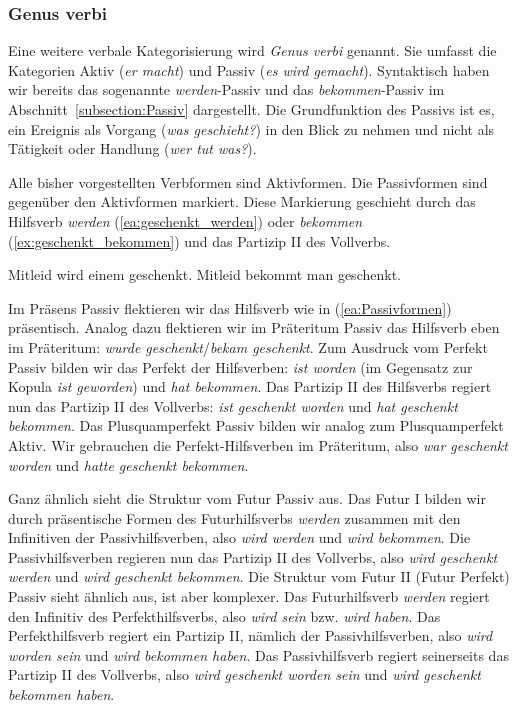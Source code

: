 \subsubsection{Genus verbi}\label{subsubsection:Genus verbi}

Eine weitere verbale Kategorisierung wird \textit{Genus verbi} genannt. Sie umfasst die Kategorien Aktiv (\textit{er macht}) und Passiv (\textit{es wird gemacht}). Syntaktisch haben wir bereits das sogenannte \textit{werden}-Passiv und das \textit{bekommen}-Passiv im Abschnitt~\ref{subsection:Passiv} dargestellt. Die Grundfunktion des Passivs ist es, ein Ereignis als Vorgang (\textit{was geschieht?}) in den Blick zu nehmen und nicht als Tätigkeit oder Handlung (\textit{wer tut was?}).

Alle bisher vorgestellten Verbformen sind Aktivformen. Die Passivformen sind gegenüber den Aktivformen markiert. Diese Markierung geschieht durch das Hilfsverb \textit{werden} (\ref{ea:geschenkt_werden}) oder \textit{bekommen} (\ref{ex:geschenkt_bekommen}) und das Partizip II des Vollverbs. 

\ea \label{ea:Passivformen}
\ea \label{ea:geschenkt_werden} Mitleid wird einem geschenkt.
\ex \label{ex:geschenkt_bekommen} Mitleid bekommt man geschenkt.
\z 
\z 

Im Präsens Passiv flektieren wir das Hilfsverb wie in (\ref{ea:Passivformen}) präsentisch. Analog dazu flektieren wir im Präteritum Passiv das Hilfsverb eben im Präteritum: \textit{wurde geschenkt}/\textit{bekam geschenkt}. Zum Ausdruck vom Perfekt Passiv bilden wir das Perfekt der Hilfsverben: \textit{ist worden} (im Gegensatz zur Kopula \textit{ist geworden}) und \textit{hat bekommen}. Das Partizip II des Hilfsverbs regiert nun das Partizip II des Vollverbs: \textit{ist geschenkt worden} und \textit{hat geschenkt bekommen}. Das Plusquamperfekt Passiv bilden wir analog zum Plusquamperfekt Aktiv. Wir gebrauchen die Perfekt-Hilfsverben im Präteritum, also \textit{war geschenkt worden} und \textit{hatte geschenkt bekommen}.

Ganz ähnlich sieht die Struktur vom Futur Passiv aus. Das Futur I bilden wir durch präsentische Formen des Futurhilfsverbs \textit{werden} zusammen mit den Infinitiven der Passivhilfsverben, also \textit{wird werden} und \textit{wird bekommen}. Die Passivhilfsverben regieren nun das Partizip II des Vollverbs, also \textit{wird geschenkt werden} und \textit{wird geschenkt bekommen}. Die Struktur vom Futur II (Futur Perfekt) Passiv sieht ähnlich aus, ist aber komplexer. Das Futurhilfsverb \textit{werden} regiert den Infinitiv des Perfekthilfsverbs, also \textit{wird sein} bzw. \textit{wird haben}. Das Perfekthilfsverb regiert ein Partizip II, nämlich der Passivhilfsverben, also \textit{wird worden sein} und \textit{wird bekommen haben}. Das Passivhilfsverb regiert seinerseits das Partizip II des Vollverbs, also \textit{wird geschenkt worden sein} und \textit{wird geschenkt bekommen haben}. 

